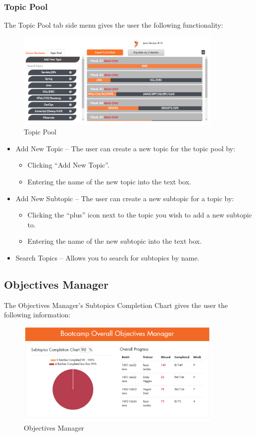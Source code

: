 \subsubsection{Topic Pool}
The Topic Pool tab side menu gives the user the following functionality:

\begin{figure}[htp]
\centering
\includegraphics[width=10cm]{images/TopicView}
\caption{Topic Pool}
\label{fig:lion}
\end{figure}

\begin{itemize}
    \item Add New Topic – The user can create a new topic for the topic pool by:
    \begin{itemize}
        \item Clicking “Add New Topic”.
        \item Entering the name of the new topic into the text box.
    \end{itemize}
    \item Add New Subtopic – The user can create a new subtopic for a topic by:
    \begin{itemize}
        \item Clicking the “plus” icon next to the topic you wish to add a new subtopic to.
        \item Entering the name of the new subtopic into the text box.
    \end{itemize}
    \item Search Topics – Allows you to search for subtopics by name.
\end{itemize}
\subsection{Objectives Manager}
The Objectives Manager’s Subtopics Completion Chart gives the user the following information:

\begin{figure}[htp]
\centering
\includegraphics[width=10cm]{images/Objective}
\caption{Objectives Manager}
\label{fig:lion}
\end{figure}


